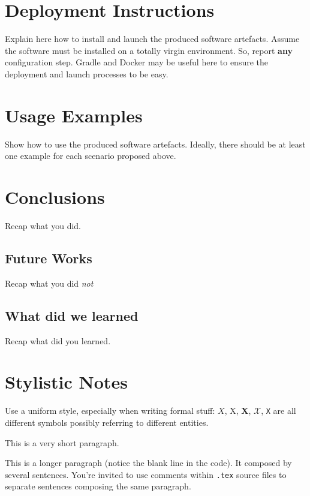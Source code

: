 \documentclass{scrartcl}
\begin{document}
\section{Deployment Instructions}

Explain here how to install and launch the produced software artefacts.
%
Assume the software must be installed on a totally virgin environment.
%
So, report \textbf{any} configuration step.
%
Gradle and Docker may be useful here to ensure the deployment and launch processes to be easy.

\section{Usage Examples}

Show how to use the produced software artefacts.
%
Ideally, there should be at least one example for each scenario proposed above.

\section{Conclusions}

Recap what you did.

\subsection{Future Works}

Recap what you did \emph{not}

\subsection{What did we learned}

Recap what did you learned.

\section*{Stylistic Notes}

Use a uniform style, especially when writing formal stuff: $X$, X, $\mathbf{X}$, $\mathcal{X}$, \texttt{X} are all different symbols possibly referring to different entities. 

This is a very short paragraph.

This is a longer paragraph (notice the blank line in the code).
It composed by several sentences.
%
You're invited to use comments within \texttt{.tex} source files to separate sentences composing the same paragraph.
\end{document}

